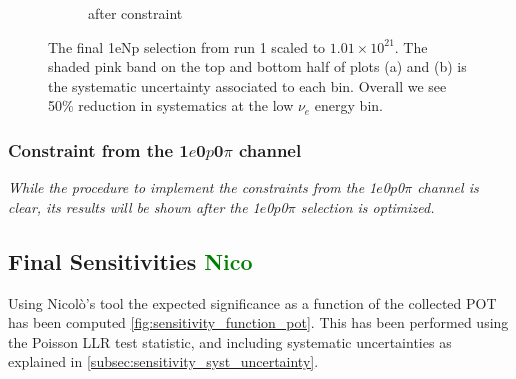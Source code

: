 \documentclass[a4paper]{article}
\newcommand{\zpsel}{1$e$0$p$0$\pi$ }
\begin{document}
\begin{figure}[ht]
\begin{center}
\begin{subfigure}[b]{0.45\textwidth}
    \caption{after constraint}
    \end{subfigure}
\caption{\label{fig:numuconstraintresult} The final 1eNp selection from run 1 scaled to $1.01 \times 10^{21}$. The shaded pink band on the top and bottom half of plots (a) and (b) is the systematic uncertainty associated to each bin. Overall we see 50\% reduction in systematics at the low $\nu_e$ energy bin.}
\end{center}
\end{figure}



\subsubsection{Constraint from the \zpsel channel}
\label{sec:1e0pconstraint}
\emph{While the procedure to implement the constraints from the \zpsel channel is clear, its results will be shown after the \zpsel selection is optimized.}


\subsection{Final Sensitivities \textcolor{green}{Nico}}

Using Nicol\`o's tool the expected significance as a function of the collected POT has been computed \ref{fig:sensitivity_function_pot}.
This has been performed using the Poisson LLR test statistic, and including systematic uncertainties as explained in \ref{subsec:sensitivity_syst_uncertainty}.
\end{document}
